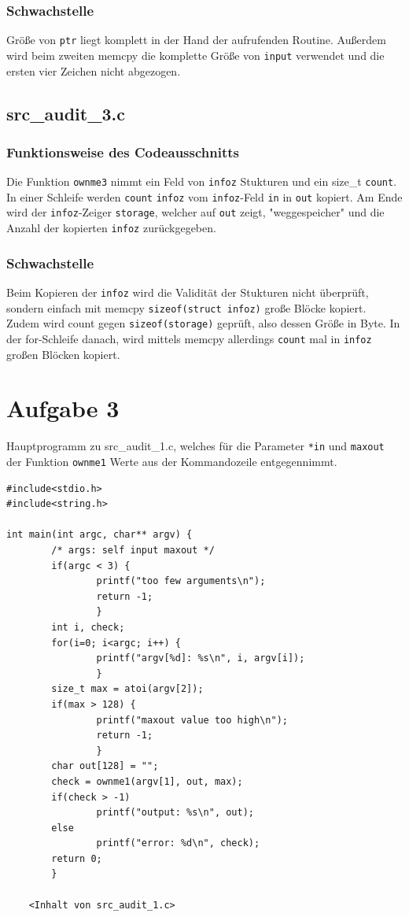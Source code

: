 \documentclass[11pt,a4paper]{article}
\begin{document}
\subsubsection{Schwachstelle}
Größe von \texttt{ptr} liegt komplett in der Hand der aufrufenden Routine. Außerdem wird beim zweiten memcpy die komplette Größe von \texttt{input} verwendet und die ersten vier Zeichen nicht abgezogen.
\subsection{src\_audit\_3.c}
\subsubsection{Funktionsweise des Codeausschnitts}
Die Funktion \texttt{ownme3} nimmt ein Feld von \texttt{infoz} Stukturen und ein size\_t \texttt{count}. In einer Schleife werden \texttt{count} \texttt{infoz} vom \texttt{infoz}-Feld \texttt{in} in \texttt{out} kopiert. Am Ende wird der \texttt{infoz}-Zeiger \texttt{storage}, welcher auf \texttt{out} zeigt, "weggespeicher" und die Anzahl der kopierten \texttt{infoz} zurückgegeben.
\subsubsection{Schwachstelle}
Beim Kopieren der \texttt{infoz} wird die Validität der Stukturen nicht überprüft, sondern einfach mit memcpy \texttt{sizeof(struct infoz)} große Blöcke kopiert. Zudem wird count gegen \texttt{sizeof(storage)} geprüft, also dessen Größe in Byte. In der for-Schleife danach, wird mittels memcpy allerdings \texttt{count} mal in \texttt{infoz} großen Blöcken kopiert.
\section{Aufgabe 3}
Hauptprogramm zu src\_audit\_1.c, welches für die Parameter \texttt{*in} und \texttt{maxout} der Funktion \texttt{ownme1} Werte aus der Kommandozeile entgegennimmt.
\begin{lstlisting}[frame=single]
#include<stdio.h>
#include<string.h>

int main(int argc, char** argv) {
        /* args: self input maxout */
        if(argc < 3) {
                printf("too few arguments\n");
                return -1;
                }
        int i, check;
        for(i=0; i<argc; i++) {
                printf("argv[%d]: %s\n", i, argv[i]);
                }
        size_t max = atoi(argv[2]);
        if(max > 128) {
                printf("maxout value too high\n");
                return -1;
                }
        char out[128] = "";
        check = ownme1(argv[1], out, max);
        if(check > -1)
                printf("output: %s\n", out);
        else
                printf("error: %d\n", check);
        return 0;
        }

    <Inhalt von src_audit_1.c>

\end{lstlisting}
\end{document}
